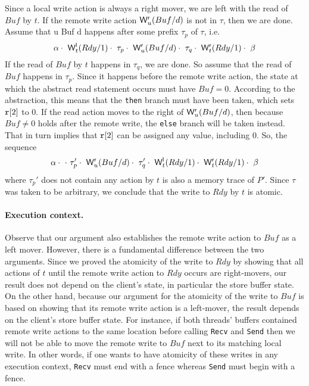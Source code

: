 \documentclass[preprint,9pt]{sigplanconf}
\begin{document}
Since a local write action is always a right mover, we are left with the read of $Buf$ by $t$.
If the remote write action $\mathsf{W}^{\mathsf{r}}_{u}(Buf/d)$ is not in $\tau$, then we are done.
Assume that \remwritex u {Buf} d happens after some prefix $\tau_p$ of $\tau$, i.e.
\[
\alpha\cdot\ \mathsf{W}^{\mathsf{l}}_{t}(Rdy/1)\cdot\ \tau_p\cdot\ \mathsf{W}^{\mathsf{r}}_{u}(Buf/d)\cdot\ \tau_q\cdot\ \mathsf{W}^{\mathsf{r}}_{t}(Rdy/1)\cdot\ \beta
\]
If the read of $Buf$ by $t$ happens in $\tau_q$, we are done.
So assume that the read of $Buf$ happens in $\tau_p$.
Since it happens before the remote write action, the state at which the abstract read statement occurs must have $Buf=0$.
According to the abstraction, this means that the {\tt then} branch must have been taken, which sets $\mathtt{r}[2]$ to 0.
If the read action moves to the right of $\mathsf{W}^{\mathsf{r}}_{u}(Buf/d)$, then because $Buf\neq 0$ holds after the remote write, the {\tt else} branch will be taken instead.
That in turn implies that $\mathtt{r}[2]$ can be assigned any value, including 0. 
So, the sequence
\[
\alpha\cdot\ \cdot\ \tau_p'\cdot\ \remwritex u {Buf} d\cdot\ \tau_q'\cdot\ \locwritex t {Rdy} 1\cdot\ \remwritex t {Rdy} 1\cdot\ \beta
\]
where $\tau_p'$ does not contain any action by $t$ is also a memory trace of $P'$.
Since $\tau$ was taken to be arbitrary, we conclude that the write to $Rdy$ by $t$ is atomic.

\paragraph{Execution context.}
Observe that our argument also establishes the remote write action to $Buf$ as a left mover. 
However, there is a fundamental difference between the two arguments.
Since we proved the atomicity of the write to $Rdy$ by showing that all actions of $t$ until the remote write action to $Rdy$ occurs are right-movers, our result does not depend on the client's state, in particular the store buffer state. 
On the other hand, because our argument for the atomicity of the write to $Buf$ is based on showing that its remote write action is a left-mover, the result depends on the client's store buffer state. 
For instance, if both threads' buffers contained remote write actions to the same location before calling {\tt Recv} and {\tt Send} then we will not be able to move the remote write to $Buf$ next to its matching local write.
In other words, if one wants to have atomicity of these writes in any execution context, {\tt Recv} must end with a fence whereas {\tt Send} must begin with a fence.
\end{document}
